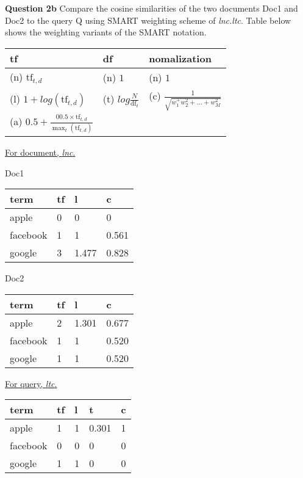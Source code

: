 \documentclass[11pt,a4paper]{report}
\begin{document}
\begin{multicols*}{2}
\noindent \textbf{Question 2b} Compare the cosine similarities of the two documents Doc1 and Doc2 to the query Q using SMART weighting scheme of \textit{lnc.ltc}. Table below shows the weighting variants of the SMART notation.

\begin{center}
\begin{tabular}{|l | l | l|}
    \hline
    tf & df & nomalization \\
    \hline
    (n) $\text{tf}_{t,d}$ & (n) $1$ & (n) $1$ \\
    (l) $1 + log(\text{tf}_{t,d})$ & (t) $log \frac{N}{\text{df}_t}$ & (c) $\frac{1}{\sqrt{w_1^ + w_2^2 + \ldots + w_M^2}}$ \\
    (a) $0.5 + \frac{00.5 \times \text{tf}_{t,d}}{\max_t (\text{tf}_{t,d})}$ & & \\
    \hline
\end{tabular}
\end{center}

\noindent \underline{For document, \textit{lnc}.}

\noindent Doc1

\begin{center}
\begin{tabular}{|l | l | l | l|}
    \hline
    term     & tf & l & c \\
    \hline
    apple    & 0 & 0 & 0 \\
    facebook & 1 & 1 & 0.561\\
    google   & 3 & 1.477 & 0.828\\
    \hline
\end{tabular}
\end{center}

\noindent Doc2

\begin{center}
\begin{tabular}{|l | l | l | l|}
    \hline
    term     & tf & l & c \\
    \hline
    apple    & 2 & 1.301 & 0.677 \\
    facebook & 1 & 1 & 0.520\\
    google   & 1 & 1 & 0.520\\
    \hline
\end{tabular}
\end{center}

\noindent \underline{For query, \textit{ltc}.}

\begin{center}
\begin{tabular}{|l | l | l | l | l |}
    \hline
    term     & tf & l & t & c \\
    \hline
    apple    & 1  & 1 & 0.301 & 1\\
    facebook & 0  & 0 & 0 & 0\\
    google   & 1  & 1 & 0 & 0 \\
    \hline
\end{tabular}
\end{center}


\end{multicols*}
\end{document}
